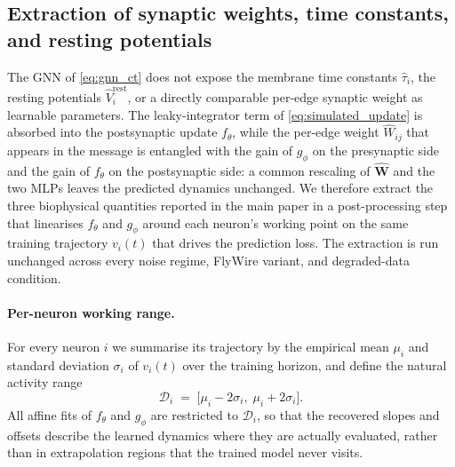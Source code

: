 \documentclass{article}
\begin{document}


\subsection{Extraction of synaptic weights, time constants, and resting potentials}
\label{app:extraction}
{\color{red}%

The GNN of \cref{eq:gnn_ct} does not expose the membrane time
constants $\hat\tau_i$, the resting potentials
$\hat V^{\mathrm{rest}}_i$, or a directly comparable per-edge
synaptic weight as learnable parameters. The leaky-integrator term
of \cref{eq:simulated_update} is absorbed into the postsynaptic
update $f_\theta$, while the per-edge weight $\hat{W}_{ij}$
that appears in the message is entangled with the gain of $g_\phi$
on the presynaptic side and the gain of $f_\theta$ on the
postsynaptic side: a common rescaling of $\hat{\mathbf{W}}$ and the
two MLPs leaves the predicted dynamics unchanged. We therefore
extract the three biophysical quantities reported in the main paper
in a post-processing step that linearises $f_\theta$ and $g_\phi$
around each neuron's working point on the same training trajectory
$v_i(t)$ that drives the prediction loss. The extraction is run
unchanged across every noise regime, FlyWire variant, and
degraded-data condition.

\paragraph{Per-neuron working range.}
For every neuron $i$ we summarise its trajectory by the empirical
mean $\mu_i$ and standard deviation $\sigma_i$ of $v_i(t)$ over
the training horizon, and define the natural activity range
\begin{equation}
    \mathcal{D}_i \;=\; \big[\mu_i - 2\sigma_i,\; \mu_i + 2\sigma_i\big].
    \label{eq:extraction_range}
\end{equation}
All affine fits of $f_\theta$ and $g_\phi$ are restricted to
$\mathcal{D}_i$, so that the recovered slopes and offsets describe
the learned dynamics where they are actually evaluated, rather than
in extrapolation regions that the trained model never visits.

}
\end{document}

